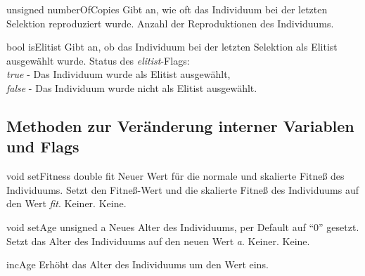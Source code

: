 \documentclass{report}
\begin{document}
\vspace{4ex}

\setConstInstance
\printEmptyMethodReturn
{unsigned}
{numberOfCopies}
{Gibt an, wie oft das Individuum bei der letzten Selektion
    reproduziert wurde.}
{Anzahl der Reproduktionen des Individuums.}

\newpage

\setConstInstance
\printEmptyMethodReturn
{bool}
{isElitist}
{Gibt an, ob das Individuum bei der letzten Selektion als Elitist
    ausgew\"ahlt wurde.}
{Status des {\em elitist}-Flags:\\
 {\em true} - Das Individuum wurde als Elitist ausgew\"ahlt,\\
 {\em false} - Das Individuum wurde nicht als Elitist ausgew\"ahlt.}

\subsection{Methoden zur Ver\"anderung interner Variablen und Flags}

\setNormalInstance
\printMethodWithOneParam
{void}
{setFitness}
{double}
{fit}
{Neuer Wert f\"ur die normale und skalierte Fitne{\ss}
                          des Individuums.}
{Setzt den Fitne{\ss}-Wert und die skalierte Fitne{\ss} des Individuums
    auf den Wert {\em fit}.}
{Keiner.}
{Keine.}

\vspace{4ex}

\setNormalInstance
\printMethodWithOneParam
{void}
{setAge}
{unsigned}
{a}
{Neues Alter des Individuums, per Default auf ``0'' gesetzt.}
{Setzt das Alter des Individuums auf den neuen Wert {\em a}.}
{Keiner.}
{Keine.}

\vspace{4ex}

\setNormalInstance
\printEmptyMethod
{incAge}
{Erh\"oht das Alter des Individuums um den Wert eins.}
\end{document}
